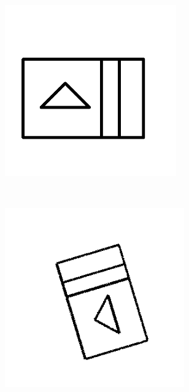     \begin{figure}[h]
    
        \centering
                \begin{subfigure}[b]{0.2\textwidth}
                \centering
                \includegraphics[width=0.81\textwidth]{figures/Results/Rotation/Model.png}
                \caption{}
        \end{subfigure}\\
                \begin{subfigure}[b]{0.25\textwidth}
                \centering
                \includegraphics[width=0.85\textwidth]{figures/Results/Rotation/1.png}

\end{subfigure}
\end{figure}
